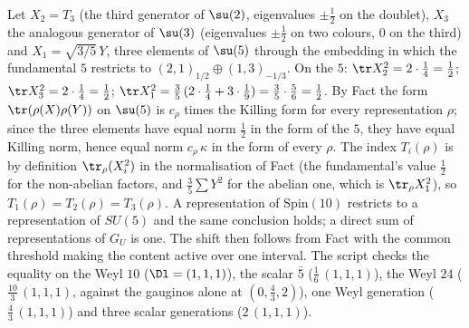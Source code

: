 Let $X_{2} = T_{3}$ (the third generator of $\su(2)$, eigenvalues $\pm\tfrac12$ on the doublet), $X_{3}$ the analogous generator of $\su(3)$ (eigenvalues $\pm\tfrac12$ on two colours, $0$ on the third) and $X_{1} = \sqrt{3/5}\,Y$, three elements of $\su(5)$ through the embedding in which the fundamental $5$ restricts to $(2,1)_{1/2} \oplus (1,3)_{-1/3}$. On the $5$: $\tr X_{2}^{2} = 2 \cdot \tfrac14 = \tfrac12$; $\tr X_{3}^{2} = 2 \cdot \tfrac14 = \tfrac12$; $\tr X_{1}^{2} = \tfrac35\,(2 \cdot \tfrac14 + 3 \cdot \tfrac19) = \tfrac35 \cdot \tfrac56 = \tfrac12$. By Fact  the form $\tr(\rho(X)\rho(Y))$ on $\su(5)$ is $c_{\rho}$ times the Killing form for every representation $\rho$; since the three elements have equal norm $\tfrac12$ in the form of the $5$, they have equal Killing norm, hence equal norm $c_{\rho}\,\kappa$ in the form of every $\rho$. The index $T_{i}(\rho)$ is by definition $\tr_{\rho}(X_{i}^{2})$ in the normalisation of Fact  (the fundamental's value $\tfrac12$ for the non-abelian factors, and $\tfrac35 \sum Y^{2}$ for the abelian one, which is $\tr_{\rho}X_{1}^{2}$), so $T_{1}(\rho) = T_{2}(\rho) = T_{3}(\rho)$. A representation of $\mathrm{Spin}(10)$ restricts to a representation of $SU(5)$ and the same conclusion holds; a direct sum of representations of $G_{U}$ is one. The shift then follows from Fact  with the common threshold making the content active over one interval. The script checks the equality on the Weyl $10$ ($\Dl = (1,1,1)$), the scalar $\bar{5}$ ($\tfrac16\,(1,1,1)$), the Weyl $24$ ($\tfrac{10}{3}\,(1,1,1)$, against the gauginos alone at $(0, \tfrac43, 2)$), one Weyl generation ($\tfrac43\,(1,1,1)$) and three scalar generations ($2\,(1,1,1)$).

